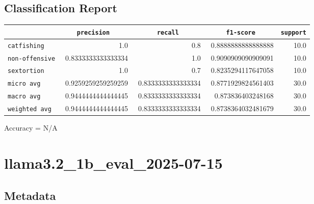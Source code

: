 \documentclass{article}
\begin{document}
\subsection{Classification Report}

\begin{center}
\begin{tabular}{l | r | r | r | r} \hline
    \verb|            | & \verb|    precision     | & \verb|      recall      | & \verb|     f1-score     | & \verb|support| \\ \hline
    \hline
    \verb|catfishing | & 1.0 & 0.8 & 0.8888888888888888 &    10.0 \\ \hline
    \verb|non-offensive| & 0.8333333333333334 & 1.0 & 0.9090909090909091 &    10.0 \\ \hline
    \verb|sextortion | & 1.0 & 0.7 & 0.8235294117647058 &    10.0 \\ \hline
    \verb|micro avg  | & 0.9259259259259259 & 0.8333333333333334 & 0.8771929824561403 &    30.0 \\ \hline
    \verb|macro avg  | & 0.9444444444444445 & 0.8333333333333334 & 0.873836403248168 &    30.0 \\ \hline
    \verb|weighted avg| & 0.9444444444444445 & 0.8333333333333334 & 0.8738364032481679 &    30.0 \\ \hline
\end{tabular}
\end{center}

\begin{center}
Accuracy = N/A
\end{center}

\section{llama3.2\_1b\_eval\_2025-07-15}
\subsection{Metadata}
\end{document}
